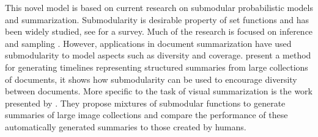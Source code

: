 This novel model is based on current research on submodular probabilistic models and summarization. Submodularity is desirable property of set functions and has been widely studied, see \cite{krause14submodular} for a survey. Much of the research is focused on inference \citep{djolonga14variational, djolonga15scalable} and sampling \citep{gotovos15sampling}. However, applications in document summarization have used submodularity to model aspects such as diversity and coverage. \citet{Shahaf2012, Shahaf2013} present a method for generating timelines representing structured summaries from large collections of documents, it shows how submodularity can be used to encourage diversity between documents. More specific to the task of visual summarization is the work presented by \citet{Tschiatschek2014}. They propose mixtures of submodular functions to generate summaries of large image collections and compare the performance of these automatically generated summaries to those created by humans.
